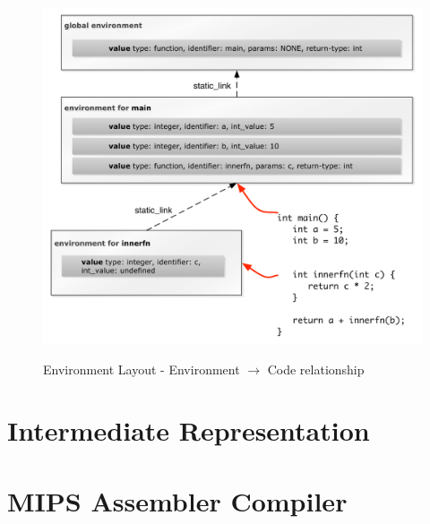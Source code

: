 \begin{figure}[p]
	\includegraphics[scale=0.7]{environments-include.pdf}
	\label{fig:environment}
	\caption{Environment Layout - Environment $\rightarrow$ Code relationship}
\end{figure}


\section{Intermediate Representation}
\label{section:MIPS}
\section{MIPS Assembler Compiler}